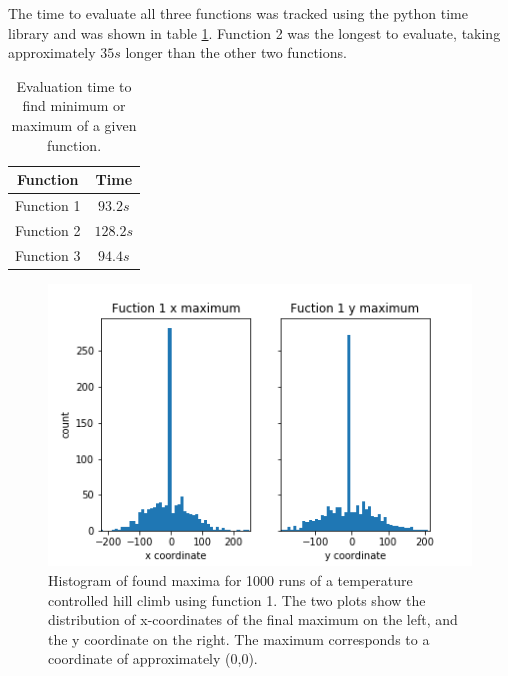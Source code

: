 \documentclass[twocolumn]{article}
\begin{document}
The time to evaluate all three functions was tracked using the python time library and was shown in table \ref{tab}. Function 2 was the longest to evaluate, taking approximately $35s$ longer than the other two functions.

\begin{table}
\begin{center}
\begin{tabular}{|c|c|}
	\hline Function & Time \\ 
	\hline Function 1 & $93.2s$  \\ 
	\hline Function 2 &  $128.2s$\\ 
	\hline Function 3 & $94.4s$  \\
	\hline
\end{tabular} 
\caption{Evaluation time to find minimum or maximum of a given function.}
\label{tab}
\end{center}
\end{table}

\begin{figure}[p]
\centering
\includegraphics[width=\linewidth]{"figure 1 maximum"}
\caption{Histogram of found maxima for 1000 runs of a temperature controlled hill climb using function 1. The two plots show the distribution of x-coordinates of the final maximum on the left, and the y coordinate on the right. The maximum corresponds to a coordinate of approximately (0,0).}
\label{fig:figure1maximum}
\end{figure}
\end{document}
